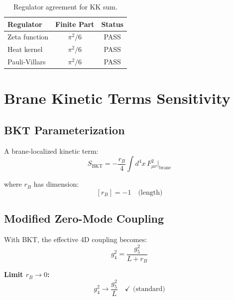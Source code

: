 \documentclass[11pt,a4paper]{article}
\begin{document}
\begin{table}[ht]
\centering
\caption{Regulator agreement for KK sum.}
\label{tab:regulator-agree}
\begin{tabular}{lcc}
\toprule
Regulator & Finite Part & Status \\
\midrule
Zeta function & $\pi^2/6$ & PASS \\
Heat kernel & $\pi^2/6$ & PASS \\
Pauli-Villars & $\pi^2/6$ & PASS \\
\bottomrule
\end{tabular}
\end{table}

\section{Brane Kinetic Terms Sensitivity}
\label{sec:bkt}

\subsection{BKT Parameterization}
\label{subsec:bkt-param}

A brane-localized kinetic term:
\begin{equation}
\label{eq:bkt-action}
S_{\text{BKT}} = -\frac{r_B}{4} \int d^4x \, F_{\mu\nu}^2 \bigg|_{\text{brane}}
\end{equation}

where $r_B$ has dimension:
\begin{equation}
\label{eq:rb-dim}
[r_B] = -1 \quad \text{(length)}
\end{equation}

\subsection{Modified Zero-Mode Coupling}
\label{subsec:bkt-g4}

With BKT, the effective 4D coupling becomes:
\begin{equation}
\label{eq:g4-bkt}
\boxed{g_4^2 = \frac{g_5^2}{L + r_B}}
\end{equation}

\textbf{Limit $r_B \to 0$:}
\begin{equation}
\label{eq:bkt-limit-0}
g_4^2 \to \frac{g_5^2}{L} \quad \checkmark \text{ (standard)}
\end{equation}
\end{document}

